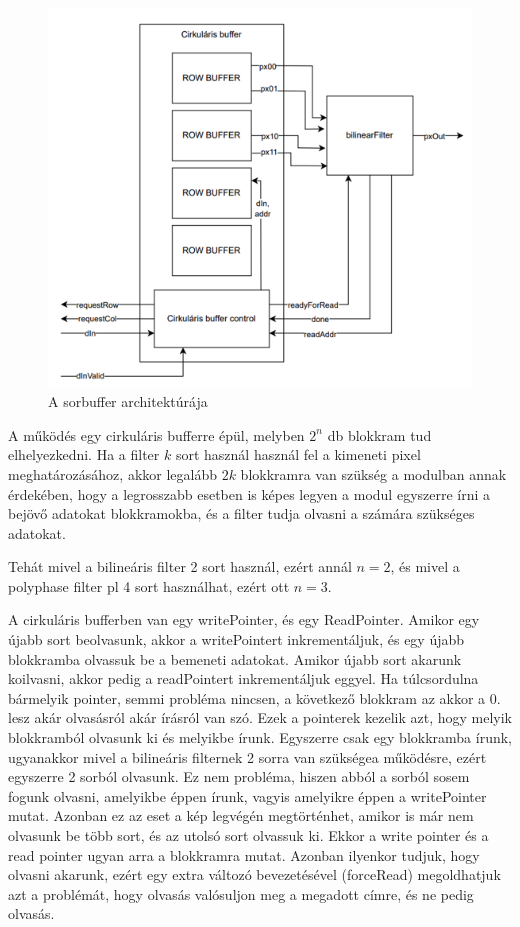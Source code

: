 \begin{figure}[!ht]
	\centering
	\includegraphics[width=120mm, keepaspectratio]{figures/sorbuffer.png}
	\caption{A sorbuffer architektúrája} 
	\label{pic:sorbuffer}
\end{figure}
\newpage

A működés egy cirkuláris bufferre épül, melyben $2^n$ db blokkram tud elhelyezkedni. Ha a filter $k$ sort használ használ fel a kimeneti pixel meghatározásához, akkor legalább $2k$ blokkramra van szükség a modulban annak érdekében, hogy a legrosszabb esetben is képes legyen a modul egyszerre írni a bejövő adatokat blokkramokba, és a filter tudja olvasni a számára szükséges adatokat. 

Tehát mivel a bilineáris filter 2 sort használ, ezért annál $n=2$, és mivel a polyphase filter pl 4 sort használhat, ezért ott $n=3$.

A cirkuláris bufferben van egy writePointer, és egy ReadPointer. Amikor egy újabb sort beolvasunk, akkor a writePointert inkrementáljuk, és egy újabb blokkramba olvassuk be a bemeneti adatokat. Amikor újabb sort akarunk koilvasni, akkor pedig a readPointert inkrementáljuk eggyel. Ha túlcsordulna bármelyik pointer, semmi probléma nincsen, a következő blokkram az akkor a 0. lesz akár olvasásról akár írásról van szó. Ezek a pointerek kezelik azt, hogy melyik blokkramból olvasunk ki és melyikbe írunk. Egyszerre csak egy blokkramba írunk, ugyanakkor mivel a bilineáris filternek 2 sorra van szükségea működésre, ezért egyszerre 2 sorból olvasunk. Ez nem probléma, hiszen abból a sorból sosem fogunk olvasni, amelyikbe éppen írunk, vagyis amelyikre éppen a writePointer mutat. Azonban ez az eset a kép legvégén megtörténhet, amikor is már nem olvasunk be több sort, és az utolsó sort olvassuk ki. Ekkor a write pointer és a read pointer ugyan arra a blokkramra mutat. Azonban ilyenkor tudjuk, hogy olvasni akarunk, ezért egy extra változó bevezetésével (forceRead) megoldhatjuk azt a problémát, hogy olvasás valósuljon meg a megadott címre, és ne pedig olvasás. 

